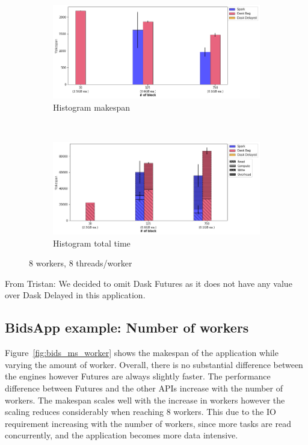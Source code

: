 \documentclass[conference]{IEEEtran}
\newcommand{\TG}[1]{\color{cyan}From Tristan: #1 \color{black}}
\begin{document}
\begin{figure}[!t]
    \centering
    \begin{subfigure}[b]{\columnwidth}
        \includegraphics[clip,width=\columnwidth]{images/histo_block.png}%
        \caption{Histogram makespan}\label{fig:histo_ms_block}
    \end{subfigure}
    \\
    \begin{subfigure}[b]{\columnwidth}
        \includegraphics[clip,width=\columnwidth]{images/histo_idle_block.png}%
        \caption{Histogram total time}\label{fig:histo_tt_block}
    \end{subfigure}
    \caption{8 workers, 8 threads/worker}
\end{figure}
\TG{We decided to omit Dask Futures as it does not have any value over Dask
Delayed in this application.}


\subsection{BidsApp example: Number of workers}
Figure~\ref{fig:bids_ms_worker} shows the makespan of the application while varying
the amount of worker. Overall, there is no substantial difference between the
engines however Futures are always slightly faster. The performance difference between
Futures and the other APIs increase with the number of workers. The makespan scales
well with the increase in workers however the scaling reduces considerably when
reaching 8 workers. This due to the IO requirement increasing with the number of
workers, since more tasks are read concurrently, and the application becomes more data
intensive.
\end{document}

